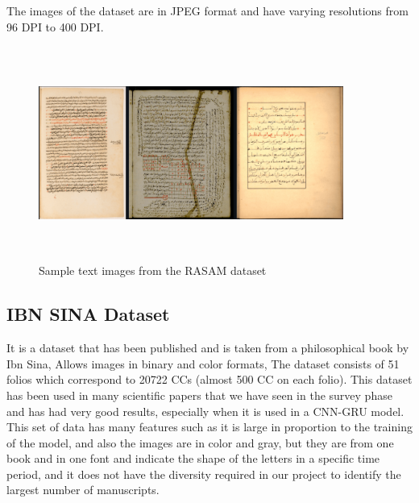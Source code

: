 The images of the dataset are in JPEG format and have varying resolutions from 96 DPI to 400 DPI.

\begin{figure}[!htb]
    \centering
    \includegraphics[width=10cm , height=7cm]{images/RASAM sample.png}
    \caption{Sample text images from the RASAM dataset}
    \label{fig:RASAM sample dataset}
\end{figure}

\subsection{IBN SINA Dataset}
It is a dataset that has been published and is taken from a philosophical book by Ibn Sina, Allows images in binary and color formats, The dataset consists of 51 folios which correspond to 20722 CCs (almost 500 CC on each folio)\cite{farrahi2010ibn}.
This dataset has been used in many scientific papers that we have seen in the survey phase and has had very good results, especially when it is used in a CNN-GRU model\cite{hassen2021subword}.
This set of data has many features such as it is large in proportion to the training of the model, and also the images are in color and gray, but they are from one book and in one font and indicate the shape of the letters in a specific time period, and it does not have the diversity required in our project to identify the largest number of manuscripts.

